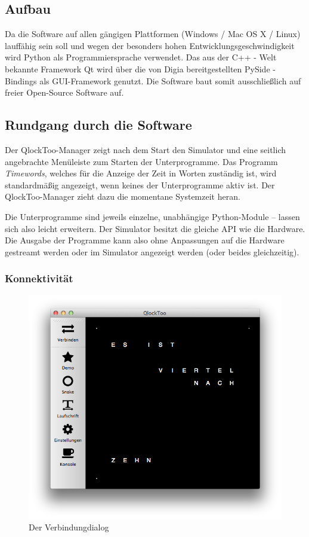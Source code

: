 \subsection{Aufbau}
Da die Software auf allen gängigen Plattformen (Windows / Mac OS X / Linux) lauffähig sein soll und wegen der besonders hohen Entwicklungsgeschwindigkeit wird Python als Programmiersprache verwendet.
Das aus der C++ - Welt bekannte Framework Qt wird über die von Digia bereitgestellten PySide -Bindings als GUI-Framework genutzt. Die Software baut somit ausschließlich auf freier Open-Source Software auf.

\subsection{Rundgang durch die Software}
Der QlockToo-Manager zeigt nach dem Start den Simulator und eine seitlich angebrachte Menüleiste zum Starten der Unterprogramme.
Das Programm \emph{Timewords}, welches für die Anzeige der Zeit in Worten zuständig ist, wird standardmäßig angezeigt, wenn keines der Unterprogramme aktiv ist. Der QlockToo-Manager zieht dazu die momentane Systemzeit heran.

Die Unterprogramme sind jeweils einzelne, unabhängige Python-Module -- lassen sich also leicht erweitern.
Der Simulator besitzt die gleiche API wie die Hardware. Die Ausgabe der Programme kann also ohne Anpassungen auf die Hardware gestreamt werden oder im Simulator angezeigt werden (oder beides gleichzeitig).

\subsubsection{Konnektivität}
\begin{figure}[h]
    \centering
    \includegraphics[width=\columnwidth,draft]{Abbildungen/Screenshot}
    \caption[Verbindungsdialog]{Der Verbindungdialog}
    \label{fig:Verbindungsdialog}
\end{figure}

